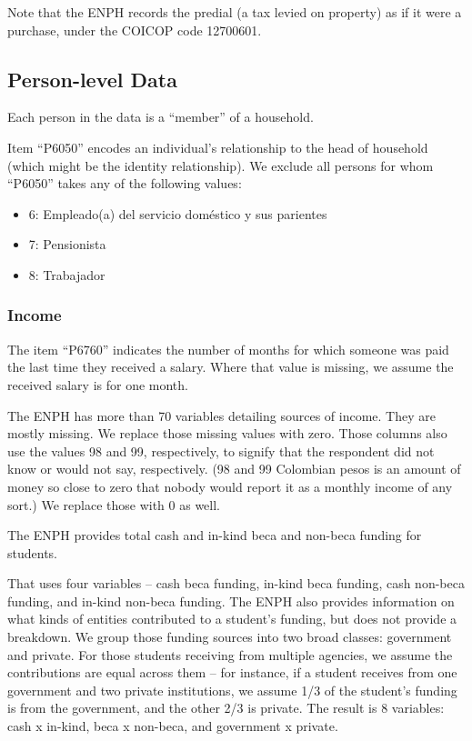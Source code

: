 \documentclass[12pt]{article}
\begin{document}
\begin{appendices}
Note that the ENPH records the predial (a tax levied on property)
as if it were a purchase, under the COICOP code 12700601.


\subsection{Person-level Data}
Each person in the data is a ``member'' of a household.

Item ``P6050'' encodes an individual's relationship to the head of household
(which might be the identity relationship).
We exclude all persons for whom ``P6050'' takes any of the following values:
\begin{itemize}
\item 6: Empleado(a) del servicio doméstico y sus parientes
\item 7: Pensionista
\item 8: Trabajador
\end{itemize}

\subsubsection{Income}
The item ``P6760'' indicates the number of months
for which someone was paid the last time they received a salary.
Where that value is missing, we assume the received salary is for one month.

The ENPH has more than 70 variables detailing sources of income.
They are mostly missing.
We replace those missing values with zero.
Those columns also use the values 98 and 99, respectively,
to signify that the respondent did not know or would not say, respectively.
(98 and 99 Colombian pesos is an amount of money so close to zero
that nobody would report it as a monthly income of any sort.)
We replace those with 0 as well.

The ENPH provides total cash and in-kind beca and non-beca funding for students.
\iffalse
    [[AN ECONOMIST:
        How can I explain the difference between beca and non-beca funding?]]
\fi
That uses four variables --
cash beca funding, in-kind beca funding, cash non-beca funding, and in-kind non-beca funding.
The ENPH also provides information on
what kinds of entities contributed to a student's funding,
but does not provide a breakdown.
We group those funding sources into two broad classes: government and private.
For those students receiving from multiple agencies,
we assume the contributions are equal across them -- for instance,
if a student receives from one government and two private institutions,
we assume 1/3 of the student's funding is from the government,
and the other 2/3 is private.
The result is 8 variables:
cash x in-kind, beca x non-beca, and government x private.


\end{appendices}
\end{document}
